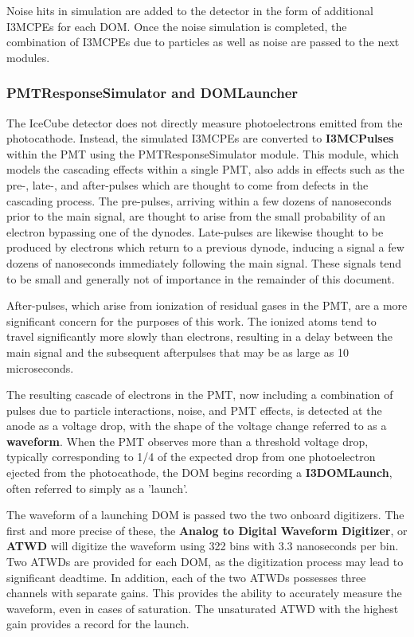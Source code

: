 Noise hits in simulation are added to the detector in the form of additional I3MCPEs for each DOM. Once the noise simulation is completed, the combination of I3MCPEs due to particles as well as noise are passed to the next modules.

\subsubsection{PMTResponseSimulator and DOMLauncher}
The IceCube detector does not directly measure photoelectrons emitted from the photocathode. 
Instead, the simulated I3MCPEs are converted to \textbf{I3MCPulses} within the PMT using the PMTResponseSimulator module.
This module, which models the cascading effects within a single PMT, also adds in effects such as the pre-, late-, and after-pulses which are thought to come from defects in the cascading process.
The pre-pulses, arriving within a few dozens of nanoseconds prior to the main signal, are thought to arise from the small probability of an electron bypassing one of the dynodes. 
Late-pulses are likewise thought to be produced by electrons which return to a previous dynode, inducing a signal a few dozens of nanoseconds immediately following the main signal.
These signals tend to be small and generally not of importance in the remainder of this document.

After-pulses, which arise from ionization of residual gases in the PMT, are a more significant concern for the purposes of this work. 
The ionized atoms tend to travel significantly more slowly than electrons, resulting in a  delay between the main signal and the subsequent afterpulses that may be as large as 10 microseconds.

The resulting cascade of electrons in the PMT, now including a combination of pulses due to particle interactions, noise, and PMT effects, is detected at the anode as a voltage drop, with the shape of the voltage change referred to as a \textbf{waveform}. 
When the PMT observes more than a threshold voltage drop, typically corresponding to 1/4 of the expected drop from one photoelectron ejected from the photocathode, the DOM begins recording a \textbf{I3DOMLaunch}, often referred to simply as a 'launch'. 

The waveform of a launching DOM is passed two the two onboard digitizers.
The first and more precise of these, the \textbf{Analog to Digital Waveform Digitizer}, or \textbf{ATWD} will digitize the waveform using 322 bins with 3.3 nanoseconds per bin. 
Two ATWDs are provided for each DOM, as the digitization process may lead to significant deadtime.
In addition, each of the two ATWDs possesses three channels with separate gains.
This provides the ability to accurately measure the waveform, even in cases of saturation.
The unsaturated ATWD with the highest gain provides a record for the launch.

